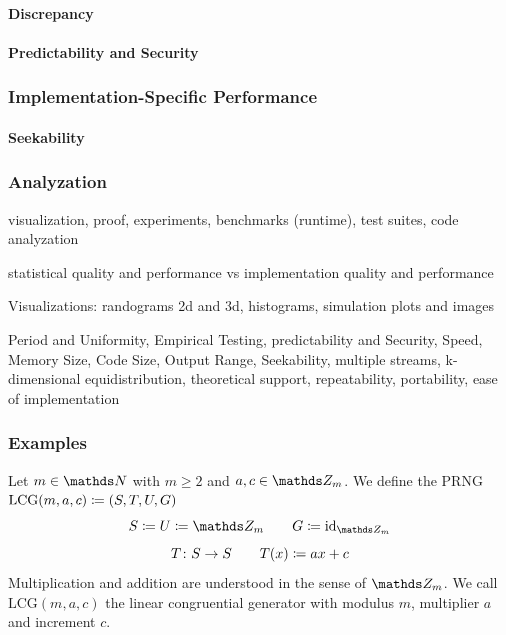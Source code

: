 \documentclass{stdlocal}
\begin{document}
    \paragraph{Discrepancy}

    \paragraph{Predictability and Security}


    \subsubsection{Implementation-Specific Performance}
    \paragraph{Seekability}


    \subsubsection{Analyzation}
    visualization, proof, experiments, benchmarks (runtime), test suites, code analyzation

    statistical quality and performance vs implementation quality and performance

    Visualizations: randograms 2d and 3d, histograms, simulation plots and images

    Period and Uniformity, Empirical Testing, predictability and Security, Speed, Memory Size, Code Size, Output Range, Seekability, multiple streams, k-dimensional equidistribution, theoretical support, repeatability, portability, ease of implementation

    \subsubsection{Examples}
      \begin{definition}
        Let $m\in\setNatural$ with $m\geq 2$ and $a,c\in\setInteger_m$.
        We define the PRNG $\mathrm{LCG}(m,a,c) \coloneqq (S,T,U,G)$
        \[
          S \define U \define \setInteger_m
          \separate
          G \define \identity_{\setInteger_m}
        \]
        \[
          T\colon S\to S
          \qquad
          T(x) \coloneqq a x + c
        \]
        Multiplication and addition are understood in the sense of $\setInteger_m$.
        We call $\mathrm{LCG}(m,a,c)$ the linear congruential generator with modulus $m$, multiplier $a$ and increment $c$.
      \end{definition}
\end{document}
